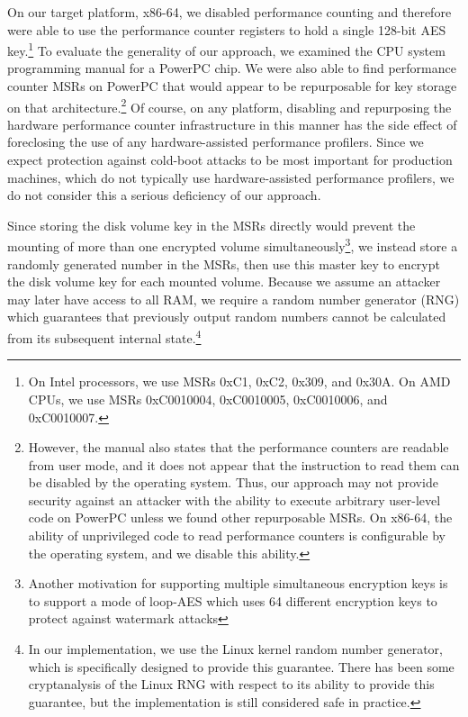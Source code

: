 \documentclass[letterpaper,twocolumn,nonatbib,10pt]{article}
\begin{document}
On our target platform, x86-64, we disabled performance counting and
therefore were able to use the performance counter registers to hold a
single 128-bit AES key.\footnote{On Intel\cite{inteldoc} processors,
  we use MSRs 0xC1, 0xC2, 0x309, and 0x30A.  On AMD\cite{amddoc} CPUs,
  we use MSRs 0xC0010004, 0xC0010005, 0xC0010006, and 0xC0010007.}  To
evaluate the generality of our approach, we examined the CPU system
programming manual for a PowerPC chip\cite{freescaledoc}.  We were
also able to find performance counter MSRs on PowerPC that would
appear to be repurposable for key storage on that
architecture.\footnote{However, the manual also states that the
  performance counters are readable from user mode, and it does not
  appear that the instruction to read them can be disabled by the
  operating system.  Thus, our approach may not provide security
  against an attacker with the ability to execute arbitrary user-level
  code on PowerPC unless we found other repurposable MSRs.  On x86-64,
  the ability of unprivileged code to read performance counters is
  configurable by the operating system, and we disable this ability.}
Of course, on any platform, disabling and repurposing the hardware
performance counter infrastructure in this manner has the side effect
of foreclosing the use of any hardware-assisted performance profilers.
Since we expect protection against cold-boot attacks to be most
important for production machines, which do not typically use
hardware-assisted performance profilers, we do not consider this a
serious deficiency of our approach.

Since storing the disk volume key in the MSRs directly would prevent
the mounting of more than one encrypted volume
simultaneously\footnote{Another motivation for supporting multiple
  simultaneous encryption keys is to support a mode of loop-AES which
  uses 64 different encryption keys to protect against watermark
  attacks\cite{loopaes}}, we instead store a randomly generated number
in the MSRs, then use this master key to encrypt the disk volume key
for each mounted volume.  Because we assume an attacker may later have
access to all RAM, we require a random number generator (RNG) which
guarantees that previously output random numbers cannot be calculated
from its subsequent internal state.\footnote{In our implementation, we
  use the Linux kernel random number generator, which is specifically
  designed to provide this guarantee.  There has been some
  cryptanalysis of the Linux RNG with respect to its ability to
  provide this guarantee\cite{linuxrngvuln}, but the implementation is
  still considered safe in practice\cite{linuxrngcounter}.}
\end{document}
